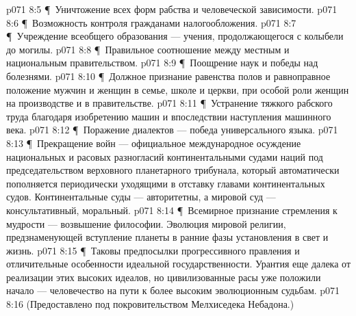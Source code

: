 \vs p071 8:5 \P\ \bibnobreakspace Уничтожение всех форм рабства и человеческой зависимости.
\vs p071 8:6 \P\ \bibnobreakspace Возможность контроля гражданами налогообложения.
\vs p071 8:7 \P\ \bibnobreakspace Учреждение всеобщего образования --- учения, продолжающегося с колыбели до могилы.
\vs p071 8:8 \P\ \bibnobreakspace Правильное соотношение между местным и национальным правительством.
\vs p071 8:9 \P\ \bibnobreakspace Поощрение наук и победы над болезнями.
\vs p071 8:10 \P\ \bibnobreakspace Должное признание равенства полов и равноправное положение мужчин и женщин в семье, школе и церкви, при особой роли женщин на производстве и в правительстве.
\vs p071 8:11 \P\ \bibnobreakspace Устранение тяжкого рабского труда благодаря изобретению машин и впоследствии наступления машинного века.
\vs p071 8:12 \P\ \bibnobreakspace Поражение диалектов --- победа универсального языка.
\vs p071 8:13 \P\ \bibnobreakspace Прекращение войн --- официальное международное осуждение национальных и расовых разногласий континентальными судами наций под председательством верховного планетарного трибунала, который автоматически пополняется периодически уходящими в отставку главами континентальных судов. Континентальные суды --- авторитетны, а мировой суд --- консультативный, моральный.
\vs p071 8:14 \P\ \bibnobreakspace Всемирное признание стремления к мудрости --- возвышение философии. Эволюция мировой религии, предзнаменующей вступление планеты в ранние фазы установления в свет и жизнь.
\vs p071 8:15 \P\ Таковы предпосылки прогрессивного правления и отличительные особенности идеальной государственности. Урантия еще далека от реализации этих высоких идеалов, но цивилизованные расы уже положили начало --- человечество на пути к более высоким эволюционным судьбам.
\vs p071 8:16 (Предоставлено под покровительством Мелхиседека Небадона.)
